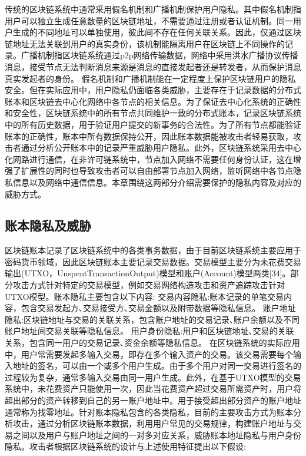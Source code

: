 传统的区块链系统中通常采用假名机制和广播机制保护用户隐私。其中假名机制指用户可以独立生成任意数量的区块链地址，不需要通过注册或者认证机制。同一用户生成的不同地址可以单独使用，彼此间不存在任何关联关系。因此，仅通过区块链地址无法关联到用户的真实身份，该机制能隔离用户在区块链上不同操作的记录。广播机制指区块链系统通过p2p网络传输数据，网络中采用洪水广播协议传播消息，接受节点无法判断消息来源是消息的直接发起者还是转发者，从而保护消息真实发起者的身份。
假名机制和广播机制能在一定程度上保护区块链用户的隐私安全。但在实际应用中，用户隐私仍面临各类威胁，主要存在于记录数据的分布式账本和区块链去中心化网络中各节点的相关信息。为了保证去中心化系统的正确性和安全性，区块链系统中的所有节点共同维护一致的分布式账本，记录区块链系统中的所有历史数据，用于验证用户提交的新事务的合法性。为了所有节点都能验证账本的正确性，账本中所有数据保持公开，因此账本数据能被攻击者轻易获取，攻击者通过分析公开账本中的记录严重威胁用户隐私。此外，区块链系统采用去中心化网路进行通信，在非许可链系统中，节点加入网络不需要任何身份认证，这在增强了扩展性的同时也导致攻击者可以自由部署节点加入网络，监听网络中各节点隐私信息以及网络中通信信息。本章围绕这两部分介绍需要保护的隐私内容及对应的威胁方式。

\subsection{账本隐私及威胁}

区块链账本记录了区块链系统中的各类事务数据，由于目前区块链系统主要应用于密码货币领域，因此区块链账本主要记录交易数据。交易模型主要分为未花费交易输出(UTXO，UnspentTransactionOutput)模型和账户(Account)模型两类[34]。部分攻击方式针对特定的交易模型，例如交易网络构造攻击和资产追踪攻击针对UTXO模型。账本隐私主要包含以下内容:
交易内容隐私:账本记录的单笔交易内容，包含交易发起方､交易接受方､交易金额以及附带数据等隐私信息。
账户地址隐私:区块链地址与交易的关联关系，包含账户地址的交易记录､账户余额以及不同账户地址间交易关联等隐私信息。
用户身份隐私:用户和区块链地址､交易的关联关系，包含同一用户的交易记录､资金余额等隐私信息。
在区块链系统的实际应用中，用户常需要发起多输入交易，即存在多个输入资产的交易。该交易需要每个输入地址的签名，可以由一个或多个用户生成。由于多个用户对同一交易进行签名的过程较为复杂，通常多输入交易由同一用户生成。此外，在基于UTXO模型的交易系统中，未花费资产只能使用一次，因此当花费资产超过交易所需资产时，用户将超出部分的资产转移到自己的另一账户地址中。用于接受超出部分资产的账户地址通常称为找零地址。针对账本隐私包含的各类隐私，目前的主要攻击方式为账本分析攻击，通过分析区块链账本数据，利用用户常见的交易规律，构建账户地址与交易之间以及用户与账户地址之间的一对多对应关系，威胁账本地址隐私与用户身份隐私。攻击者根据区块链系统的设计与上述使用特征提出以下假设:

